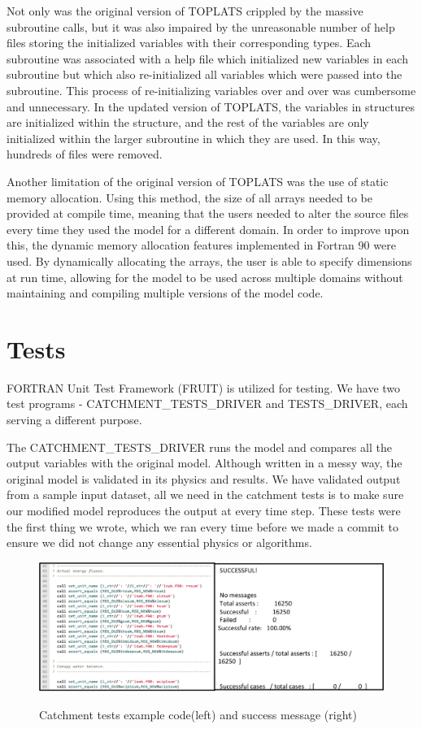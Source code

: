 \documentclass[pdftex,12pt,a4paper]{article}
\begin{document}
Not only was the original version of TOPLATS crippled by the massive subroutine calls, but it was also impaired by the unreasonable number of help files storing the initialized variables with their corresponding types. Each subroutine was associated with a help file which initialized new variables in each subroutine but which also re-initialized all variables which were passed into the subroutine. This process of re-initializing variables over and over was cumbersome and unnecessary. In the updated version of TOPLATS, the variables in structures are initialized within the structure, and the rest of the variables are only initialized within the larger subroutine in which they are used. In this way, hundreds of files were removed.

Another limitation of the original version of TOPLATS was the use of static memory allocation. Using this method, the size of all arrays needed to be provided at compile time, meaning that the users needed to alter the source files every time they used the model for a different domain. In order to improve upon this, the dynamic memory allocation features implemented in Fortran 90 were used. By dynamically allocating the arrays, the user is able to specify dimensions at run time, allowing for the model to be used across multiple domains without maintaining and compiling multiple versions of the model code.

\section{Tests}

FORTRAN Unit Test Framework (FRUIT) is utilized for testing. We have two test programs - CATCHMENT\_TESTS\_DRIVER and TESTS\_DRIVER, each serving a different purpose.

The CATCHMENT\_TESTS\_DRIVER runs the model and compares all the output variables with the original model. Although written in a messy way, the original model is validated in its physics and results. We have validated output from a sample input dataset, all we need in the catchment tests is to make sure our modified model reproduces the output at every time step. These tests were the first thing we wrote, which we ran every time before we made a commit to ensure we did not change any essential physics or algorithms.

\begin{figure}[h]
	\centering
	\includegraphics[width=5.5in]{Figures/Tests1.png}
	\label{Tests1}
	\caption{Catchment tests example code(left) and success message (right)}
\end{figure}
\end{document}
